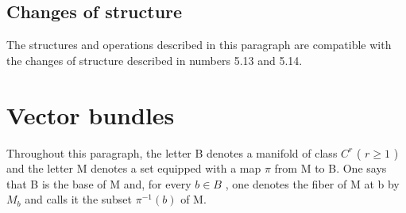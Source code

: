 \subsection{Changes of structure}

The structures and operations described in this paragraph are compatible with the changes of structure described in numbers 5.13 and 5.14.

\section{Vector bundles}

Throughout this paragraph, the letter B denotes a manifold of class \(C^{r}\) ( \(r \geqslant 1\) ) and the letter M denotes a set equipped with a map \(\pi\) from M to B. One says that B is the base of M and, for every \(b \in B\) , one denotes the fiber of M at b by \(M_{b}\) and calls it the subset \(\pi^{-1}(b)\) of M.
